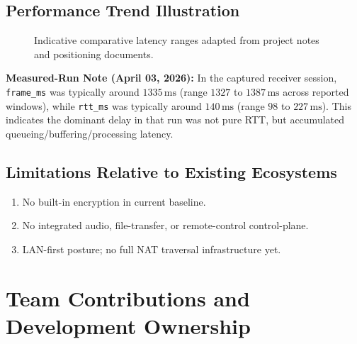 \documentclass[12pt,a4paper]{article}
\begin{document}
\subsection{Performance Trend Illustration}
\begin{figure}[H]
\centering
{}
\caption{Indicative comparative latency ranges adapted from project notes and positioning documents.}
\label{fig:latencybar}
\end{figure}

\noindent\textbf{Measured-Run Note (April 03, 2026):} In the captured receiver session, \texttt{frame\_ms} was typically around \(1335\,\mathrm{ms}\) (range \(1327\) to \(1387\,\mathrm{ms}\) across reported windows), while \texttt{rtt\_ms} was typically around \(140\,\mathrm{ms}\) (range \(98\) to \(227\,\mathrm{ms}\)). This indicates the dominant delay in that run was not pure RTT, but accumulated queueing/buffering/processing latency.

\subsection{Limitations Relative to Existing Ecosystems}
\begin{enumerate}[label=\textbf{\arabic*.}, itemsep=6pt]
  \item No built-in encryption in current baseline.
  \item No integrated audio, file-transfer, or remote-control control-plane.
  \item LAN-first posture; no full NAT traversal infrastructure yet.
\end{enumerate}

\newpage

\section{Team Contributions and Development Ownership}
\end{document}
